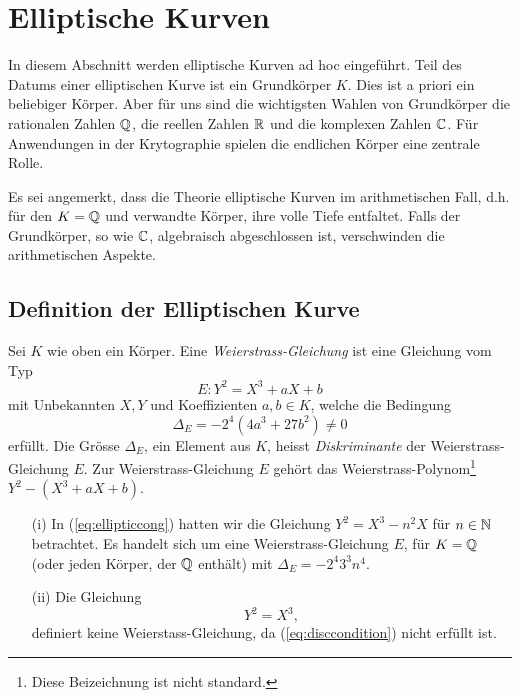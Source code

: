 \chapter{Elliptische Kurven}

In diesem Abschnitt werden elliptische Kurven ad hoc eingeführt.
Teil des Datums einer elliptischen Kurve ist ein Grundkörper $K$. Dies
ist a priori ein beliebiger Körper. Aber für uns sind die wichtigsten
Wahlen von Grundkörper die rationalen Zahlen ${\mathbb{Q}}$, die reellen Zahlen
${\mathbb{R}}$ und die komplexen Zahlen ${\mathbb{C}}$. Für Anwendungen in der
Krytographie spielen  die endlichen Körper eine zentrale Rolle.


Es sei angemerkt, dass die Theorie elliptische Kurven im
arithmetischen Fall, d.h. für den  $K={\mathbb{Q}}$ und verwandte Körper, ihre
volle Tiefe entfaltet. Falls der Grundkörper, so wie ${\mathbb{C}}$,
algebraisch abgeschlossen ist, verschwinden die arithmetischen
Aspekte.


\section{Definition der Elliptischen Kurve}

\begin{definition}
  Sei $K$ wie oben ein Körper.
  Eine \emph{Weierstrass-Gleichung} ist eine Gleichung vom Typ
  \begin{equation}
    \label{eq:weierstrass}
    E: Y^2 = X^3 + aX+b
  \end{equation}
  mit Unbekannten $X,Y$ und Koeffizienten $a,b\in K$, welche die
  Bedingung
  \begin{equation}
    \label{eq:disccondition}
    \Delta_E = -2^4(4a^3+27b^2)\not=0
  \end{equation}
  erfüllt. Die Grösse $\Delta_E$, ein Element aus $K$, heisst
  \emph{Diskriminante}
  der Weierstrass-Gleichung $E$. Zur Weierstrass-Gleichung $E$ gehört
  das Weierstrass-Polynom\footnote{Diese Beizeichnung ist nicht
    standard.} $Y^2- (X^3+aX+b)$.
\end{definition}

\begin{beispiele}\leavevmode
  \begin{enumerate}
  \item [(i)] In (\ref{eq:ellipticcong}) hatten wir die Gleichung $Y^2 = X^3-n^2X$
    für $n\in{\mathbb{N}}$ betrachtet. Es handelt sich um eine
    Weierstrass-Gleichung $E$, für $K={\mathbb{Q}}$ (oder jeden Körper, der ${\mathbb{Q}}$
    enthält) mit $\Delta_E = -2^4 3^3 n^4$.
  \item[(ii)] Die Gleichung
    \begin{equation*}
      Y^2 = X^3,
    \end{equation*}
    definiert keine Weierstass-Gleichung, da (\ref{eq:disccondition})
    nicht erfüllt ist.
  \end{enumerate}
\end{beispiele}


